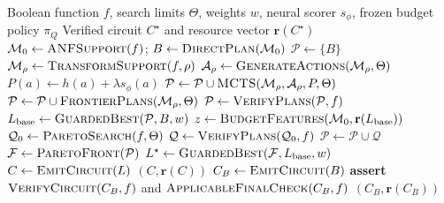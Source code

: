 \begin{algorithm}[H]
\caption{Resource-NMCTS with reinforcement-learned Pareto budget control.}
\label{alg:resource-nmcts}
\footnotesize
\begin{algorithmic}[1]
\Require Boolean function $f$, search limits $\Theta$, weights $w$, neural scorer $s_\phi$, frozen budget policy $\pi_Q$
\Ensure Verified circuit $C^\star$ and resource vector $\mathbf{r}(C^\star)$
\State $\mathcal{M}_0\gets\Call{ANFSupport}{f}$; $B\gets\Call{DirectPlan}{\mathcal{M}_0}$
\State $\mathcal{P}\gets\{B\}$ 
  \State $\mathcal{M}_\rho\gets\Call{TransformSupport}{f,\rho}$
  \State $\mathcal{A}_\rho\gets\Call{GenerateActions}{\mathcal{M}_\rho,\Theta}$ 
    \State $P(a)\gets h(a)+\lambda s_\phi(a)$
  \EndFor
  \State $\mathcal{P}\gets\mathcal{P}\cup\Call{MCTS}{\mathcal{M}_\rho,\mathcal{A}_\rho,P,\Theta}$
  \State $\mathcal{P}\gets\mathcal{P}\cup\Call{FrontierPlans}{\mathcal{M}_\rho,\Theta}$
\EndFor
\State $\mathcal{P}\gets\Call{VerifyPlans}{\mathcal{P},f}$ 
\State $L_{\mathrm{base}}\gets\Call{GuardedBest}{\mathcal{P},B,w}$
\State $z\gets\Call{BudgetFeatures}{\mathcal{M}_0,\mathbf{r}(L_{\mathrm{base}})}$
  \State $\mathcal{Q}_0\gets\Call{ParetoSearch}{f,\Theta}$
  \State $\mathcal{Q}\gets\Call{VerifyPlans}{\mathcal{Q}_0,f}$
  \State $\mathcal{P}\gets\mathcal{P}\cup\mathcal{Q}$
\EndIf
\State $\mathcal{F}\gets\Call{ParetoFront}{\mathcal{P}}$
\State $L^\star\gets\Call{GuardedBest}{\mathcal{F},L_{\mathrm{base}},w}$
  \State $C\gets\Call{EmitCircuit}{L}$ 
    \State \Return $(C,\mathbf{r}(C))$
\EndIf
\EndFor
\State $C_B\gets\Call{EmitCircuit}{B}$
\State \textbf{assert} $\Call{VerifyCircuit}{C_B,f}$ and $\Call{ApplicableFinalCheck}{C_B,f}$
\State \Return $(C_B,\mathbf{r}(C_B))$ 
\end{algorithmic}
\end{algorithm}
